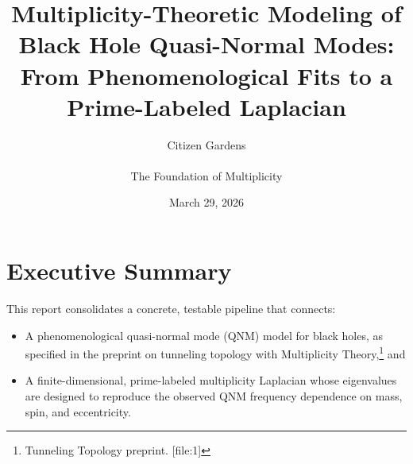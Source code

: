 \documentclass[11pt]{article}
\title{Multiplicity-Theoretic Modeling of Black Hole Quasi-Normal Modes: From Phenomenological Fits to a Prime-Labeled Laplacian}
\author{Citizen Gardens \\ \\ The Foundation of Multiplicity}
\date{March 29, 2026}
\begin{document}
\maketitle

\section*{Executive Summary}

This report consolidates a concrete, testable pipeline that connects:
\begin{itemize}
  \item A phenomenological quasi-normal mode (QNM) model for black holes, as specified in the preprint on tunneling topology with Multiplicity Theory,\footnote{Tunneling Topology preprint. [file:1]} and
  \item A finite-dimensional, prime-labeled multiplicity Laplacian whose eigenvalues are designed to reproduce the observed QNM frequency dependence on mass, spin, and eccentricity.
\end{itemize}
\end{document}
